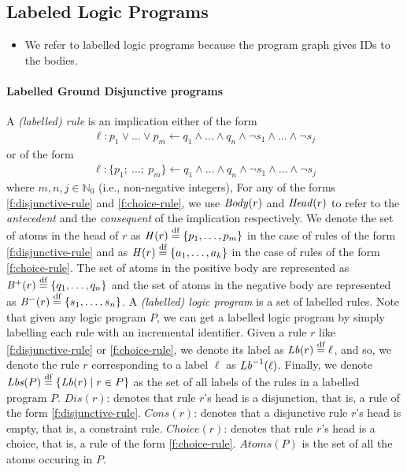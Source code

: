 \subsection{Labeled Logic Programs}

%
\begin{itemize}
  \item We refer to labelled logic programs because the program graph gives IDs to the bodies.
\end{itemize}
%

%
\paragraph{Labelled Ground Disjunctive programs}
A \emph{(labelled) rule} is an implication either of the form
\begin{eqnarray}
  \ell : p_1 \vee \dots \vee p_m \leftarrow q_1 \wedge \dots \wedge q_n \wedge \neg s_1 \wedge \dots \wedge \neg s_j \label{f:disjunctive-rule}
\end{eqnarray}
%
or of the form
%
\begin{eqnarray}
  \ell : \{p_1;\ \dots;\ p_m\} \leftarrow q_1 \wedge \dots \wedge q_n \wedge \neg s_1 \wedge \dots \wedge \neg s_j \label{f:choice-rule}
\end{eqnarray}
where $m, n, j \in \mathbb{N}_0$ (i.e., non-negative integers),
%
For any of the forms \eqref{f:disjunctive-rule} and \eqref{f:choice-rule}, we use $\mathit{Body}(r)$ and $\mathit{Head}(r)$ to refer to the \emph{antecedent} and the \emph{consequent} of the implication respectively.
%
We denote the set of atoms in the head of $r$ as
$\mathit{H}(r) \stackrel{\text{df}}{=} \{p_1, \dots, p_m\}$ in the case of rules of the form \eqref{f:disjunctive-rule}
and as $\mathit{H}(r) \stackrel{\text{df}}{=} \{a_1, \dots, a_k\}$ in the case of rules of the form \eqref{f:choice-rule}.
%
The set of atoms in the positive body are represented as
$\mathit{B}^+(r) \stackrel{\text{df}}{=} \{q_1,\dots,q_n\}$
and
the set of atoms in the negative body are represented as
$\mathit{B}^-(r) \stackrel{\text{df}}{=} \{s_1,\dots,s_n\}$.
%
A \emph{(labelled) logic program} is a set of labelled rules.
%
Note that given any logic program $P$, we can get a labelled logic program by simply labelling each rule with an incremental identifier.
%
Given a rule $r$ like \eqref{f:disjunctive-rule} or \eqref{f:choice-rule}, we denote its label as $\mathit{Lb}(r)\stackrel{\text{df}}{=} \ell$,
%
and so, we denote the rule $r$ corresponding to a label $\ell$ as $\mathit{Lb}^{-1}(\ell)$.
%
Finally, we denote $\mathit{Lbs}(P) \stackrel{\text{df}}{=} \{ \mathit{Lb}(r) \mid r \in P \}$ as the set of all labels of the rules in a labelled program $P$.
\medskip
{}
%
$Dis(r)$: denotes that rule $r$'s head is a disjunction, that is, a rule of the form \eqref{f:disjunctive-rule}.
$Cons(r)$: denotes that a disjunctive rule $r$'s head is empty, that is, a constraint rule.
$Choice(r)$: denotes that rule $r$'s head is a choice, that is, a rule of the form \eqref{f:choice-rule}.
$Atoms(P)$ is the set of all the atoms occuring in $P$.
%

